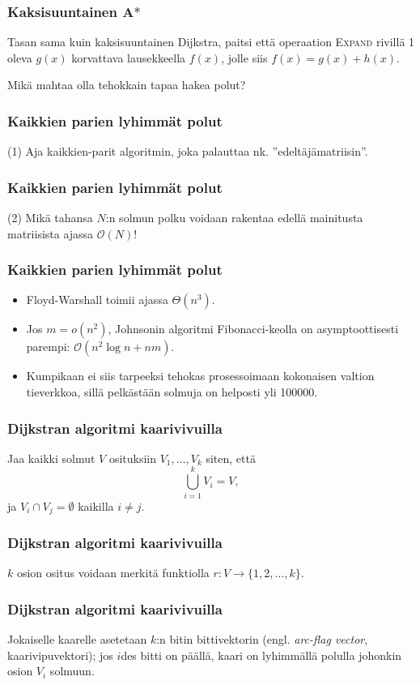 \documentclass{beamer}
\begin{document}
\begin{frame}
  \frametitle{Kaksisuuntainen A$\ast$}
  Tasan sama kuin kaksisuuntainen Dijkstra, paitsi että operaation \textsc{Expand} rivillä 1 oleva $g(x)$ korvattava lausekkeella $f(x)$, jolle siis $f(x) = g(x) + h(x)$.
\end{frame}

\begin{frame}
  Mikä mahtaa olla tehokkain tapaa hakea polut?
\end{frame}

\begin{frame}
  \frametitle{Kaikkien parien lyhimmät polut}
  (1) Aja kaikkien-parit algoritmin, joka palauttaa nk. ''edeltäjämatriisin''.
\end{frame}

\begin{frame}
  \frametitle{Kaikkien parien lyhimmät polut}
  (2) Mikä tahansa $N$:n solmun polku voidaan rakentaa edellä mainitusta matriisista ajassa $\mathcal{O}(N)$!
\end{frame}

\begin{frame}
  \frametitle{Kaikkien parien lyhimmät polut}
  \begin{itemize}
    \item Floyd-Warshall toimii ajassa $\Theta(n^3)$.
    \item Jos $m = o(n^2)$, Johnsonin algoritmi Fibonacci-keolla on asymptoottisesti parempi: $\mathcal{O}(n^2 \log n + nm)$.
    \item Kumpikaan ei siis tarpeeksi tehokas prosessoimaan kokonaisen valtion tieverkkoa, sillä pelkästään solmuja on helposti yli 100000.
  \end{itemize}
\end{frame}

\begin{frame}
  \frametitle{Dijkstran algoritmi kaarivivuilla}
    Jaa kaikki solmut $V$ osituksiin $V_1, \dots, V_k$ siten, että
    \[
      \bigcup_{i = 1}^k V_i = V,
    \]
    ja $V_i \cap V_j = \emptyset$ kaikilla $i \neq j$.
\end{frame}

\begin{frame}
  \frametitle{Dijkstran algoritmi kaarivivuilla}
  $k$ osion ositus voidaan merkitä funktiolla $r \colon V \to \{ 1, 2, \dots, k\}$.
\end{frame}

\begin{frame}
  \frametitle{Dijkstran algoritmi kaarivivuilla}
  Jokaiselle kaarelle asetetaan $k$:n bitin bittivektorin (engl. \textit{arc-flag vector}, kaarivipuvektori); jos $i$des bitti on päällä, kaari on lyhimmällä polulla johonkin osion $V_i$ solmuun.
\end{frame}
\end{document}
